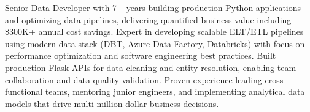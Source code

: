 
\begin{cvparagraph}
Senior Data Developer with 7+ years building production Python applications and optimizing data pipelines, delivering quantified business value including \$300K+ annual cost savings. Expert in developing scalable ELT/ETL pipelines using modern data stack (DBT, Azure Data Factory, Databricks) with focus on performance optimization and software engineering best practices. Built production Flask APIs for data cleaning and entity resolution, enabling team collaboration and data quality validation. Proven experience leading cross-functional teams, mentoring junior engineers, and implementing analytical data models that drive multi-million dollar business decisions.
\end{cvparagraph}